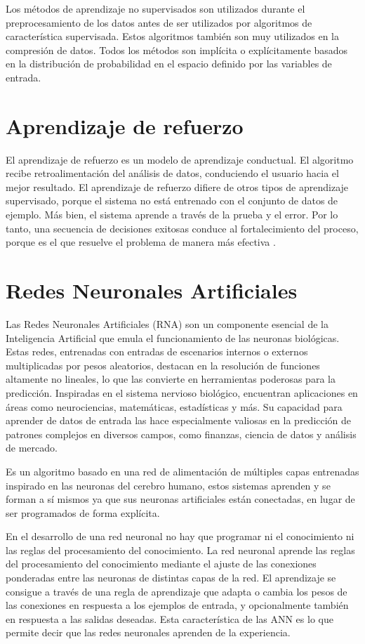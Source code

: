Los métodos de aprendizaje no supervisados son utilizados durante el preprocesamiento de los datos antes de ser utilizados por algoritmos de característica supervisada. Estos algoritmos también son muy utilizados en la compresión de datos. Todos los métodos son implícita o explícitamente basados en la distribución de probabilidad en el espacio definido por las variables de entrada\cite{de2014aprendizaje}.

\section{Aprendizaje de refuerzo}

El aprendizaje de refuerzo es un modelo de aprendizaje conductual. El algoritmo recibe retroalimentación del análisis de datos, conduciendo el usuario hacia el mejor resultado. El aprendizaje de refuerzo difiere de otros tipos de aprendizaje supervisado, porque el sistema no está entrenado con el conjunto de datos de ejemplo. Más bien, el sistema aprende a través de la prueba y el error. Por lo tanto, una secuencia de decisiones exitosas conduce al fortalecimiento del proceso, porque es el que resuelve el problema de manera más efectiva \cite{ibm}.

\section{Redes Neuronales Artificiales}
Las Redes Neuronales Artificiales (RNA) son un componente esencial de la Inteligencia Artificial que emula el funcionamiento de las neuronas biológicas. Estas redes, entrenadas con entradas de escenarios internos o externos multiplicadas por pesos aleatorios, destacan en la resolución de funciones altamente no lineales, lo que las convierte en herramientas poderosas para la predicción. Inspiradas en el sistema nervioso biológico, encuentran aplicaciones en áreas como neurociencias, matemáticas, estadísticas y más. Su capacidad para aprender de datos de entrada las hace especialmente valiosas en la predicción de patrones complejos en diversos campos, como finanzas, ciencia de datos y análisis de mercado.

Es un algoritmo basado en una red de alimentación de múltiples capas entrenadas inspirado en las neuronas del cerebro humano, estos sistemas aprenden y se forman a sí mismos ya que sus neuronas artificiales están conectadas, en lugar de ser programados de forma explícita\cite{herrera2020prediccion }.

\vspace{1\baselineskip}
En el desarrollo de una red neuronal no hay que programar ni el conocimiento ni las reglas del procesamiento del conocimiento. La red neuronal aprende las reglas del procesamiento del conocimiento mediante el ajuste de las conexiones ponderadas entre las neuronas de distintas capas de la red.
El aprendizaje se consigue a través de una regla de aprendizaje que adapta o cambia los pesos de las conexiones en respuesta a los ejemplos de entrada, y opcionalmente también en respuesta a las salidas deseadas. Esta característica de las ANN es lo que permite decir que las redes neuronales aprenden de la experiencia\cite{olabe1998redes}. 

